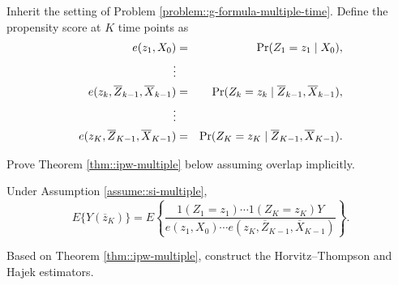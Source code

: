 \begin{HomeworkProblem}\label{exr:29-8}

Inherit the setting of Problem \ref{problem::g-formula-multiple-time}. Define the propensity score at $K$ time points as
\begin{eqnarray*}
e(z_1, X_0) &=& \operatorname{Pr}(Z_1 = z_1\mid X_0) ,\\
\vdots \\
e(z_k, \overline{Z}_{k-1},  \overline{X}_{k-1}) &=&  \operatorname{Pr}(Z_k = z_k \mid \overline{Z}_{k-1},  \overline{X}_{k-1}) ,\\
\vdots \\
e(z_K, \overline{Z}_{K-1},  \overline{X}_{K-1}) &=&  \operatorname{Pr}(Z_K = z_K \mid \overline{Z}_{K-1},  \overline{X}_{K-1}) .
\end{eqnarray*}


Prove Theorem \ref{thm::ipw-multiple} below assuming overlap implicitly.


\begin{Theorem}\label{thm::ipw-multiple}
Under Assumption \ref{assume::si-multiple},
\[
  E\{ Y(\overline{z}_K)  \}   = E\left\{
  \frac{1(Z_1 = z_1) \cdots  1( Z_K = z_K) Y}{    e(z_1, X_0)  \cdots  e(z_K, \overline{Z}_{K-1},  \overline{X}_{K-1})   }
  \right\}.
\]
\end{Theorem}


Based on Theorem \ref{thm::ipw-multiple}, construct the Horvitz--Thompson and Hajek estimators.


\end{HomeworkProblem}


